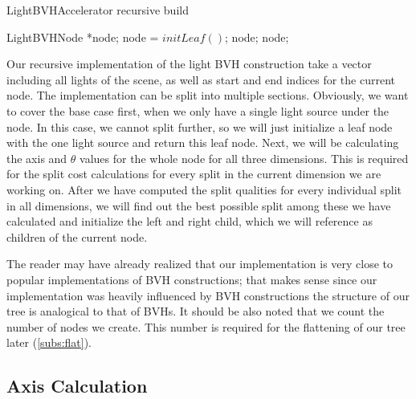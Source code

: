 \begin{algorithm}
	\caption{LightBVHAccelerator recursive build}
	\label{recursiveBuild}
	\begin{algorithmic}[1] %
		\State LightBVHNode *node;
			\State *node = $initLeaf()$;
			\State \Return node;
		\EndIf
        	\State <calculate axis and thetas for the whole node for current dimension>
			\State <calculate all split costs for current dimension>
		\EndFor
		\State <find out best split>
		\State <initialize child nodes and make reference as children>
		\State \Return node;
		\EndProcedure
	\end{algorithmic}
\end{algorithm}

Our recursive implementation of the light BVH construction take a vector including all lights of the scene, as well as start and end indices for the current node. The implementation can be split into multiple sections. Obviously, we want to cover the base case first, when we only have a single light source under the node. In this case, we cannot split further, so we will just initialize a leaf node with the one light source and return this leaf node. Next, we will be calculating the axis and $\theta$ values for the whole node for all three dimensions. This is required for the split cost calculations for every split in the current dimension we are working on. After we have computed the split qualities for every individual split in all dimensions, we will find out the best possible split among these we have calculated and initialize the left and right child, which we will reference as children of the current node.

The reader may have already realized that our implementation is very close to popular implementations of BVH constructions; that makes sense since our implementation was heavily influenced by BVH constructions the structure of our tree is analogical to that of BVHs. It should be also noted that we count the number of nodes we create. This number is required for the flattening of our tree later (\ref{subs:flat}).

\subsection{Axis Calculation}
\label{subs:axis}


